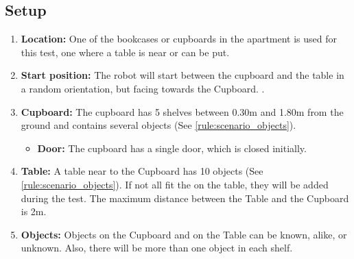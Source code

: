 \begin{minipage}{0.70\textwidth}
	\subsection{Setup}
	\begin{enumerate}
		\item \textbf{Location:} One of the bookcases or cupboards in the apartment is used for this test, one where a table is near or can be put. 
		\item \textbf{Start position:} The robot will start between the cupboard and the table in a random orientation, but facing towards the Cupboard.
		. 
		\item \textbf{Cupboard:} The cupboard has 5 shelves between 0.30m and 1.80m from the ground and contains several objects (See \ref{rule:scenario_objects}).
		\begin{itemize}
		 	\item \textbf{Door:} The cupboard has a single door, which is closed initially.
		\end{itemize} 
		\item \textbf{Table:} A table near to the Cupboard has 10 objects (See \ref{rule:scenario_objects}). If not all fit the on the table, they will be added during the test. The maximum distance between the Table and the Cupboard is 2m.
		\item \textbf{Objects:} Objects on the Cupboard and on the Table can be known, alike, or unknown. Also, there will be more than one object in each shelf. 
	\end{enumerate}
\end{minipage}\hfill
